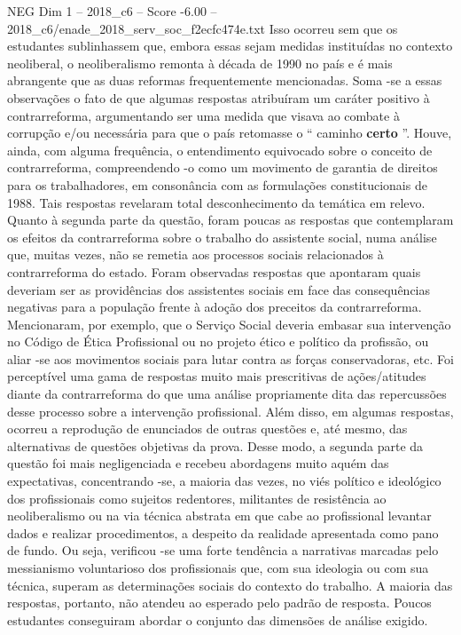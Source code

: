 \begin{textsample}{NEG Dim 1 – 2018\_c6 – Score -6.00 – 2018\_c6/enade\_2018\_serv\_soc\_f2ecfc474e.txt}
Isso ocorreu sem que os estudantes sublinhassem que, embora essas sejam medidas instituídas no contexto neoliberal, o neoliberalismo remonta à década de 1990 no país e é mais abrangente que as duas reformas frequentemente mencionadas.
Soma -se a essas observações o fato de que algumas respostas atribuíram um caráter positivo à contrarreforma, argumentando ser uma medida que visava ao combate à corrupção e/ou necessária para que o país retomasse o “ caminho \textbf{certo} ”.
Houve, ainda, com alguma frequência, o entendimento equivocado sobre o conceito de contrarreforma, compreendendo -o como um movimento de garantia de direitos para os trabalhadores, em consonância com as formulações constitucionais de 1988.
Tais respostas revelaram total desconhecimento da temática em relevo.
Quanto à segunda parte da questão, foram poucas as respostas que contemplaram os efeitos da contrarreforma sobre o trabalho do assistente social, numa análise que, muitas vezes, não se remetia aos processos sociais relacionados à contrarreforma do estado.
Foram observadas respostas que apontaram quais deveriam ser as providências dos assistentes sociais em face das consequências negativas para a população frente à adoção dos preceitos da contrarreforma.
Mencionaram, por exemplo, que o Serviço Social deveria embasar sua intervenção no Código de Ética Profissional ou no projeto ético e político da profissão, ou aliar -se aos movimentos sociais para lutar contra as forças conservadoras, etc.
Foi perceptível uma gama de respostas muito mais prescritivas de ações/atitudes diante da contrarreforma do que uma análise propriamente dita das repercussões desse processo sobre a intervenção profissional.
Além disso, em algumas respostas, ocorreu a reprodução de enunciados de outras questões e, até mesmo, das alternativas de questões objetivas da prova.
Desse modo, a segunda parte da questão foi mais negligenciada e recebeu abordagens muito aquém das expectativas, concentrando -se, a maioria das vezes, no viés político e ideológico dos profissionais como sujeitos redentores, militantes de resistência ao neoliberalismo ou na via técnica abstrata em que cabe ao profissional levantar dados e realizar procedimentos, a despeito da realidade apresentada como pano de fundo.
Ou seja, verificou -se uma forte tendência a narrativas marcadas pelo messianismo voluntarioso dos profissionais que, com sua ideologia ou com sua técnica, superam as determinações sociais do contexto do trabalho.
A maioria das respostas, portanto, não atendeu ao esperado pelo padrão de resposta.
Poucos estudantes conseguiram abordar o conjunto das dimensões de análise exigido.

\end{textsample}
